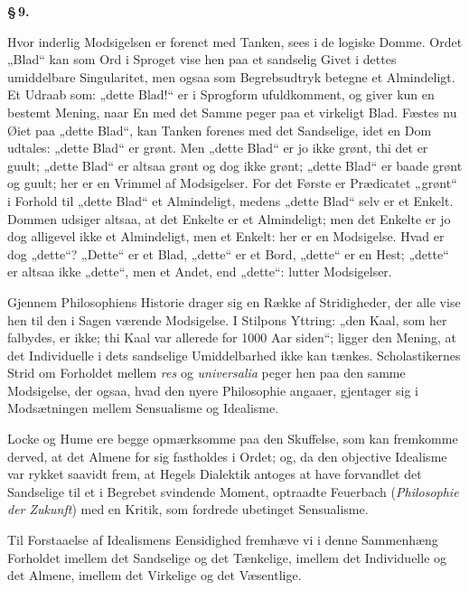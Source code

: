 \documentclass[12pt]{book}
\newcommand{\opage}[1]{\marginnote{\footnotesize\textit{[#1]}}}
\begin{document}
\opage{45} \begin{center}{\bfseries \S\,9.}\end{center}

Hvor inderlig Modsigelsen er forenet med Tanken, sees i de logiske Domme. Ordet „Blad“
kan som Ord i Sproget vise hen paa et sandselig Givet i dettes umiddelbare
Singularitet, men ogsaa som Begrebsudtryk betegne et Almindeligt. Et Udraab som:
„dette Blad!“ er i Sprogform ufuldkomment, og giver kun en bestemt Mening, naar En med
det Samme peger paa et virkeligt Blad. Fæstes nu Øiet paa „dette Blad“, kan Tanken
forenes med det Sandselige, idet en Dom udtales: „dette Blad“ er grønt. Men „dette
Blad“ er jo ikke grønt, thi det er guult; „dette Blad“ er altsaa grønt og dog ikke
grønt; „dette Blad“ er baade grønt og guult; her er en Vrimmel af Modsigelser. For det
Første er Prædicatet „grønt“ i Forhold til „dette Blad“ et Almindeligt, medens „dette
Blad“ selv er et Enkelt. Dommen udsiger altsaa, at det Enkelte er et Almindeligt; men
det Enkelte er jo dog alligevel ikke et Almindeligt, men et Enkelt: her er en
Modsigelse. Hvad er dog „dette“? „Dette“ er et Blad, „dette“ er et Bord, „dette“ er en
Hest; „dette“ er altsaa ikke „dette“, men et Andet, end „dette“: lutter Modsigelser.

Gjennem Philosophiens Historie drager sig en Række af Stridigheder, der alle vise hen
til den i Sagen værende Modsigelse. I Stilpons Yttring: „den Kaal, som her falbydes,
er ikke; thi Kaal var allerede for 1000 Aar siden“; ligger den Mening, at det
Individuelle i dets sandselige Umiddelbarhed ikke kan tænkes. Scholastikernes Strid om
Forholdet mellem \textit{res} og \textit{universalia} peger hen paa den samme
Modsigelse, der ogsaa, hvad den nyere Philosophie angaaer, gjentager sig i
Modsætningen mellem Sensualisme og Idealisme.

Locke og Hume ere begge opmærksomme paa den Skuffelse, som kan fremkomme derved, at
det Almene for sig fastholdes i Ordet; og, da den objective Idealisme var rykket
saavidt frem, at Hegels Dialektik antoges at have forvandlet
\opage{46} det Sandselige til et i Begrebet svindende Moment, optraadte Feuerbach
(\textit{Philosophie der Zukunft}) med en Kritik, som fordrede ubetinget Sensualisme.

Til Forstaaelse af Idealismens Eensidighed fremhæve vi i denne Sammenhæng Forholdet
imellem det Sandselige og det Tænkelige, imellem det Individuelle og det Almene,
imellem det Virkelige og det Væsentlige.
\end{document}
